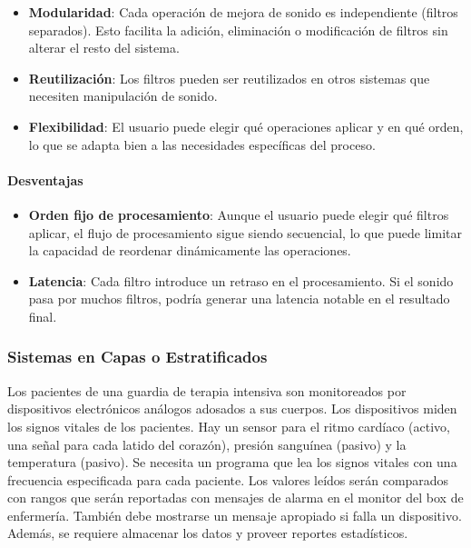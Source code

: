 	\begin{itemize}
		\item \textbf{Modularidad}: Cada operación de mejora de sonido es
			independiente (filtros separados). Esto facilita la adición, eliminación
			o modificación de filtros sin alterar el resto del sistema.

		\item \textbf{Reutilización}: Los filtros pueden ser reutilizados
			en otros sistemas que necesiten manipulación de sonido.

		\item \textbf{Flexibilidad}: El usuario puede elegir qué operaciones
			aplicar y en qué orden, lo que se adapta bien a las necesidades
			específicas del proceso.
	\end{itemize}

	\paragraph{Desventajas}

	\begin{itemize}
		\item \textbf{Orden fijo de procesamiento}: Aunque el usuario puede
			elegir qué filtros aplicar, el flujo de procesamiento sigue
			siendo secuencial, lo que puede limitar la capacidad de reordenar
			dinámicamente las operaciones.

		\item \textbf{Latencia}: Cada filtro introduce un retraso en el procesamiento.
			Si el sonido pasa por muchos filtros, podría generar una latencia
			notable en el resultado final.
	\end{itemize}

	\subsubsection{Sistemas en Capas o Estratificados}

	Los pacientes de una guardia de terapia intensiva son monitoreados por
	dispositivos electrónicos análogos adosados a sus cuerpos. Los
	dispositivos miden los signos vitales de los pacientes. Hay un sensor
	para el ritmo cardíaco (activo, una señal para cada latido del corazón),
	presión sanguínea (pasivo) y la temperatura (pasivo). Se necesita
	un programa que lea los signos vitales con una frecuencia
	especificada para cada paciente. Los valores leídos serán comparados
	con rangos que serán reportadas con mensajes de alarma en el monitor
	del box de enfermería. También debe mostrarse un mensaje apropiado
	si falla un dispositivo. Además, se requiere almacenar los datos y
	proveer reportes estadísticos.

